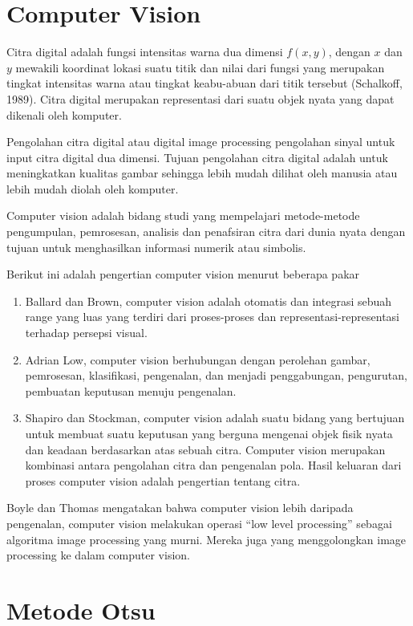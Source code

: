 \documentclass[laporan.tex]{subfiles}
\begin{document}
\section{Computer Vision}

Citra digital adalah fungsi intensitas warna dua dimensi $f(x,y)$, dengan $x$ dan $y$ mewakili koordinat lokasi suatu titik dan nilai dari fungsi yang merupakan tingkat intensitas warna atau tingkat keabu-abuan dari titik tersebut (Schalkoff, 1989). Citra digital merupakan representasi dari suatu objek nyata yang dapat dikenali oleh komputer.

Pengolahan citra digital atau digital image processing pengolahan sinyal untuk input citra digital dua dimensi. Tujuan pengolahan citra digital adalah untuk meningkatkan kualitas gambar sehingga lebih mudah dilihat oleh manusia atau lebih mudah diolah oleh komputer.

Computer vision adalah bidang studi yang mempelajari metode-metode pengumpulan, pemrosesan, analisis dan penafsiran citra dari dunia nyata dengan tujuan untuk menghasilkan informasi numerik atau simbolis.

Berikut ini adalah pengertian computer vision menurut beberapa pakar

\begin{enumerate}
\item Ballard dan Brown, computer vision adalah otomatis dan integrasi sebuah range yang luas yang terdiri dari proses-proses dan representasi-representasi terhadap persepsi visual.
\item Adrian Low, computer vision berhubungan dengan perolehan gambar, pemrosesan, klasifikasi, pengenalan, dan menjadi penggabungan, pengurutan, pembuatan keputusan menuju pengenalan.
\item Shapiro dan Stockman, computer vision adalah suatu bidang yang bertujuan untuk membuat suatu keputusan yang berguna mengenai objek fisik nyata dan keadaan berdasarkan atas sebuah citra. Computer vision merupakan kombinasi antara pengolahan citra dan pengenalan pola. Hasil keluaran dari proses computer vision adalah pengertian tentang citra.
\end{enumerate}

Boyle dan Thomas mengatakan bahwa computer vision lebih daripada pengenalan, computer vision melakukan operasi “low level processing” sebagai algoritma image processing yang murni. Mereka juga yang menggolongkan image processing ke dalam computer vision.

\section{Metode Otsu}
\end{document}
